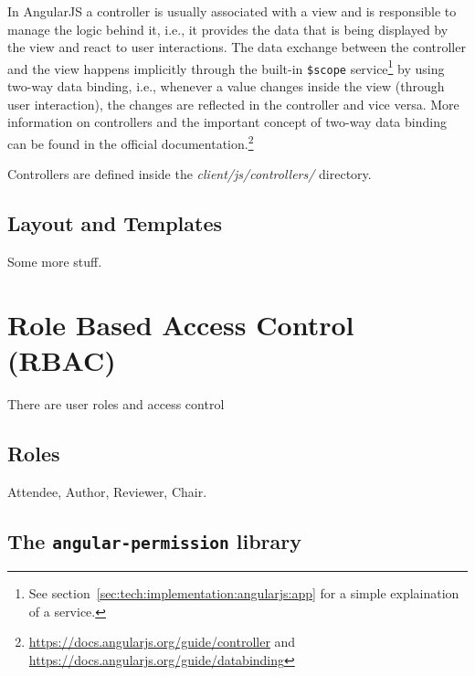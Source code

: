 \documentclass[nochapterpage,nopartpage,noheadingspace,numbersubsubsec,bigchapter,colorback,accentcolor=tud9c,10pt]{tudreport}
\begin{document}
    In AngularJS a controller is usually associated with a view and is responsible to manage the logic behind it, i.e., it provides the data that is being displayed by the view and react to user interactions. The data exchange between the controller and the view happens implicitly through the built-in \texttt{\$scope} service\footnote{See section~\ref{sec:tech:implementation:angularjs:app} for a simple explaination of a service.} by using two-way data binding, i.e., whenever a value changes inside the view (through user interaction), the changes are reflected in the controller and vice versa. More information on controllers and the important concept of two-way data binding can be found in the official documentation.\footnote{\url{https://docs.angularjs.org/guide/controller} and \url{https://docs.angularjs.org/guide/databinding}}

    Controllers are defined inside the \emph{client/js/controllers/} directory.

  \subsection{Layout and Templates}
  \label{sec:tech:implementation:angularjs:layout}

    Some more stuff.

  \section{Role Based Access Control (RBAC)}
  \label{sec:tech:implementation:rbac}

    There are user roles and access control

  \subsection{Roles}
  \label{sec:tech:implementation:acl:roles}

    Attendee, Author, Reviewer, Chair.

  \subsection{The \texttt{angular-permission} library}
  \label{sec:tech:implementation:acl:angular-permission}
\end{document}
